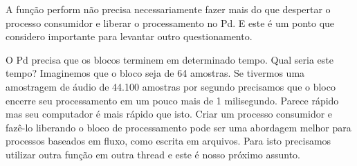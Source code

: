 A função perform não precisa necessariamente fazer mais do que despertar o processo consumidor e
liberar o processamento no Pd. E este é um ponto que considero importante para levantar outro questionamento.

O Pd precisa que os blocos terminem em determinado tempo. Qual seria este tempo? Imaginemos que o bloco seja de 
64 amostras. Se tivermos uma amostragem de áudio de 44.100 amostras por segundo precisamos que o bloco encerre seu 
processamento em um pouco mais de 1 milisegundo. Parece rápido mas seu computador é mais rápido que isto.
Criar um processo consumidor e fazê-lo liberando o bloco de processamento
pode ser uma abordagem melhor para processos baseados em fluxo, como escrita em arquivos. Para isto precisamos utilizar outra
função em outra thread e este é nosso próximo assunto.

